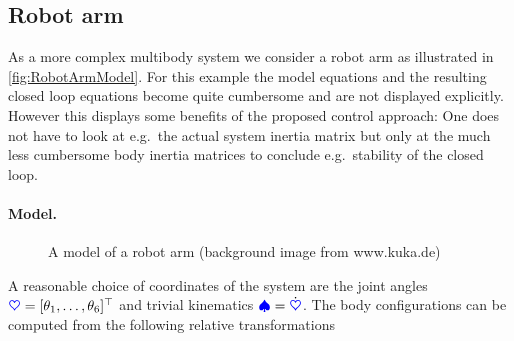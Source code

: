 \subsection{Robot arm}
As a more complex multibody system we consider a robot arm as illustrated in \autoref{fig:RobotArmModel}.
For this example the model equations and the resulting closed loop equations become quite cumbersome and are not displayed explicitly.
However this displays some benefits of the proposed control approach: One does not have to look at e.g.\ the actual system inertia matrix but only at the much less cumbersome body inertia matrices to conclude e.g.\ stability of the closed loop. 

\paragraph{Model.}
\begin{figure}[ht]
 \centering
 
 \caption{A model of a robot arm (background image from www.kuka.de)}
 \label{fig:RobotArmModel}
\end{figure}
A reasonable choice of coordinates of the system are the joint angles $\sysCoord = [\jointAngle[1], \ldots, \jointAngle[6]]^\top$ and trivial kinematics $\sysVel = \sysCoordd$.
The body configurations can be computed from the following relative transformations
